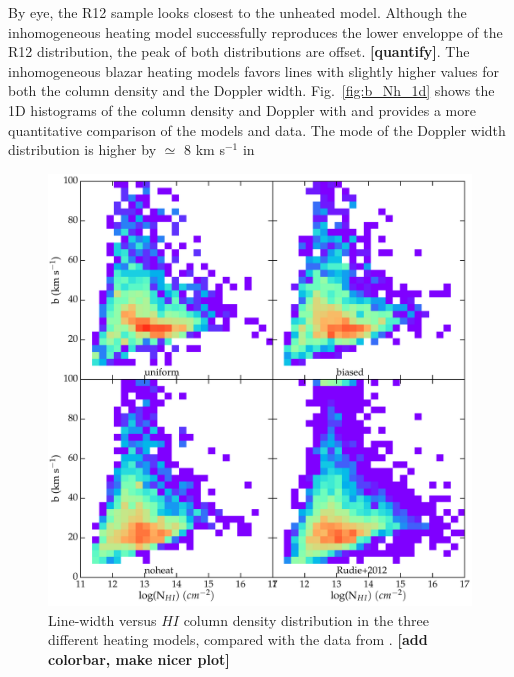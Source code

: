\documentclass[numberedappendix]{emulateapj}
\newcommand\ALc[1]{{\color{red} \bf #1}} %
\begin{document}
By eye, the R12 sample looks closest to the unheated model. Although the inhomogeneous heating model successfully reproduces the lower enveloppe of the R12 distribution,  the peak of both distributions are offset. \ALc{[quantify]}. The inhomogeneous blazar heating models favors lines with slightly higher values for both the column density and the Doppler width. Fig.~\ref{fig:b_Nh_1d} shows the 1D histograms of the column density and Doppler with and  provides a more quantitative comparison of the models and data. The mode of the Doppler width distribution is higher by $\simeq$ 8 km s$^{-1}$ in 


\begin{figure}[h]
\centering
\includegraphics[width = .8\textwidth ]{compare_rudie_bNh.pdf}
\caption{Line-width versus $HI$ column density distribution in the three different heating models, compared with the data from \citet{2012ApJ...757L..30R}.\ALc{[add colorbar, make nicer plot]}}
\label{fig:b_Nh}
\end{figure}
\end{document}
